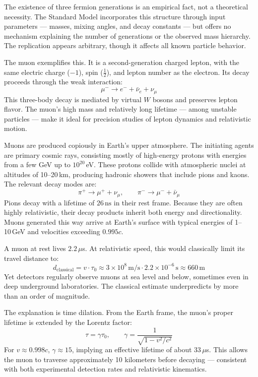 The existence of three fermion generations is an empirical fact, not a theoretical necessity. The Standard Model incorporates this structure through input parameters — masses, mixing angles, and decay constants — but offers no mechanism explaining the number of generations or the observed mass hierarchy. The replication appears arbitrary, though it affects all known particle behavior.

The muon exemplifies this. It is a second-generation charged lepton, with the same electric charge ($-1$), spin ($\tfrac{1}{2}$), and lepton number as the electron. Its decay proceeds through the weak interaction:
\[
\mu^- \rightarrow e^- + \bar{\nu}_e + \nu_\mu
\]
This three-body decay is mediated by virtual $W$ bosons and preserves lepton flavor. The muon's high mass and relatively long lifetime — among unstable particles — make it ideal for precision studies of lepton dynamics and relativistic motion.

Muons are produced copiously in Earth’s upper atmosphere. The initiating agents are primary cosmic rays, consisting mostly of high-energy protons with energies from a few GeV up to $10^{20}$ eV. These protons collide with atmospheric nuclei at altitudes of 10–20 km, producing hadronic showers that include pions and kaons. The relevant decay modes are:
\[
\pi^+ \rightarrow \mu^+ + \nu_\mu, \qquad \pi^- \rightarrow \mu^- + \bar{\nu}_\mu
\]
Pions decay with a lifetime of $26\,\text{ns}$ in their rest frame. Because they are often highly relativistic, their decay products inherit both energy and directionality. Muons generated this way arrive at Earth’s surface with typical energies of 1–10 GeV and velocities exceeding $0.995c$.

A muon at rest lives $2.2\,\mu$s. At relativistic speed, this would classically limit its travel distance to:
\[
d_{\text{classical}} = v \cdot \tau_0 \approx 3 \times 10^8\,\text{m/s} \cdot 2.2 \times 10^{-6}\,\text{s} \approx 660\,\text{m}
\]
Yet detectors regularly observe muons at sea level and below, sometimes even in deep underground laboratories. The classical estimate underpredicts by more than an order of magnitude.

The explanation is time dilation. From the Earth frame, the muon's proper lifetime is extended by the Lorentz factor:
\[
\tau = \gamma \tau_0, \qquad \gamma = \frac{1}{\sqrt{1 - v^2/c^2}}
\]
For $v \approx 0.998c$, $\gamma \approx 15$, implying an effective lifetime of about $33\,\mu$s. This allows the muon to traverse approximately 10 kilometers before decaying — consistent with both experimental detection rates and relativistic kinematics.


